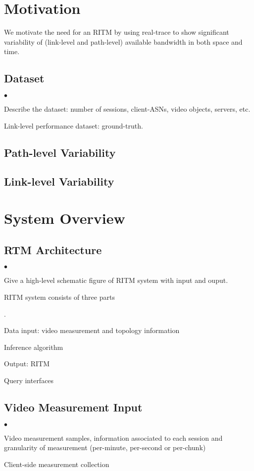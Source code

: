 \documentclass[10pt,twocolumn]{article}
\newcounter{packednmbr}
\newenvironment{packedenumerate}{\begin{list}{\thepackednmbr.}{\usecounter{packednmbr}\setlength{\itemsep}{0.5pt}\addtolength{\labelwidth}{-4pt}\setlength{\leftmargin}{\labelwidth}\setlength{\listparindent}{\parindent}\setlength{\parsep}{1pt}\setlength{\topsep}{0pt}}}{\end{list}}
\newenvironment{packeditemize}{\begin{list}{$\bullet$}{\setlength{\itemsep}{0.5pt}\addtolength{\labelwidth}{-4pt}\setlength{\leftmargin}{\labelwidth}\setlength{\listparindent}{\parindent}\setlength{\parsep}{1pt}\setlength{\topsep}{0pt}}}{\end{list}}
\begin{document}
\section{Motivation}
We motivate the need for an RITM by using real-trace to show significant variability of (link-level and path-level) available bandwidth in both space and time. 

\subsection{Dataset}
\begin{packeditemize}
	\item Describe the dataset: number of sessions, client-ASNs, video objects, servers, etc.
	\item Link-level performance dataset: ground-truth.
\end{packeditemize}


\subsection{Path-level Variability}


\subsection{Link-level Variability}


\section{System Overview}
\subsection{RTM Architecture}
\begin{packeditemize}
	\item Give a high-level schematic figure of RITM system with input and ouput.
	\item RITM system consists of three parts
	\begin{packedenumerate}
		\item Data input: video measurement and topology information
		\item Inference algorithm
		\item Output: RITM
		\item Query interfaces
	\end{packedenumerate}
\end{packeditemize}

\subsection{Video Measurement Input}
\begin{packeditemize}
	\item Video measurement samples, information associated to each session and granularity of measurement (per-minute, per-second or per-chunk)
	\item Client-side measurement collection
\end{packeditemize}
\end{document}
